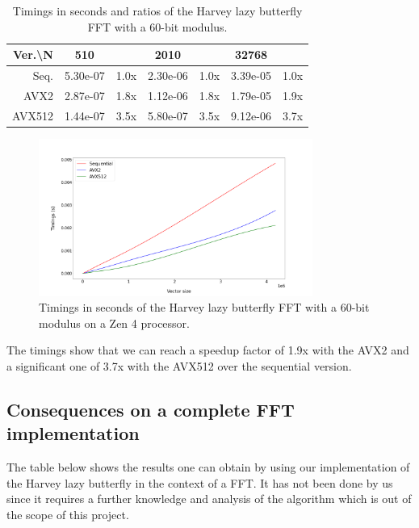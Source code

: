 \documentclass[a4paper]{article}
\begin{document}
\begin{table}[h!]
\begin{tabular}{|r|*{3}{c c|}}
        \hline
        \rowcolor{myGray}
        Ver.\textbackslash N & 510 & & 2010 & & 32768 & \\
        \hline
        \cellcolor{myGray} Seq. & 5.30e-07 & 1.0x & 2.30e-06 & 1.0x & 3.39e-05 & 1.0x \\
        \hline
        \cellcolor{myGray} AVX2 & 2.87e-07 & 1.8x & 1.12e-06 & 1.8x & 1.79e-05 & 1.9x \\
        \hline
        \cellcolor{myGray} AVX512 & 1.44e-07 & 3.5x & 5.80e-07 & 3.5x & 9.12e-06 & 3.7x \\
        \hline
    \end{tabular}
    \caption{Timings in seconds and ratios of the Harvey lazy butterfly FFT with a 60-bit modulus.}
\end{table}

\begin{figure}[h!]
    \begin{center}
        \includegraphics[width=0.8\textwidth]{lazy-butterfly_argiope.png}
    \end{center}
    \caption{Timings in seconds of the Harvey lazy butterfly FFT with a 60-bit modulus on a Zen 4 processor.}
\end{figure}

The timings show that we can reach a speedup factor of 1.9x with the AVX2 and a significant one of 3.7x with the AVX512 over the
sequential version.


\subsection{Consequences on a complete FFT implementation}

The table below shows the results one can obtain by using our implementation of the Harvey lazy butterfly
in the context of a FFT.
It has not been done by us since it requires a further knowledge and analysis of the algorithm
which is out of the scope of this project.
\end{document}
